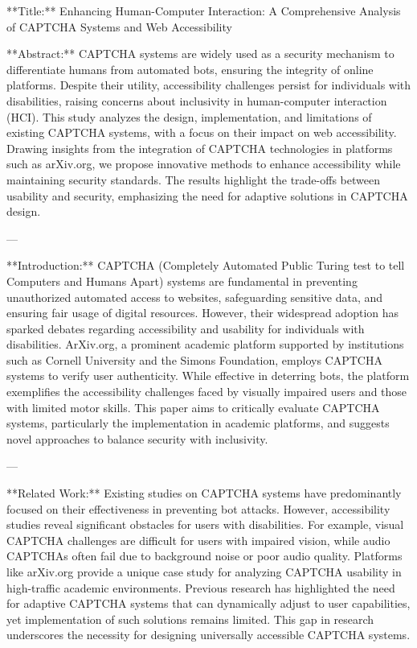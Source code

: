 **Title:** Enhancing Human-Computer Interaction: A Comprehensive Analysis of CAPTCHA Systems and Web Accessibility

**Abstract:**  
CAPTCHA systems are widely used as a security mechanism to differentiate humans from automated bots, ensuring the integrity of online platforms. Despite their utility, accessibility challenges persist for individuals with disabilities, raising concerns about inclusivity in human-computer interaction (HCI). This study analyzes the design, implementation, and limitations of existing CAPTCHA systems, with a focus on their impact on web accessibility. Drawing insights from the integration of CAPTCHA technologies in platforms such as arXiv.org, we propose innovative methods to enhance accessibility while maintaining security standards. The results highlight the trade-offs between usability and security, emphasizing the need for adaptive solutions in CAPTCHA design.

---

**Introduction:**  
CAPTCHA (Completely Automated Public Turing test to tell Computers and Humans Apart) systems are fundamental in preventing unauthorized automated access to websites, safeguarding sensitive data, and ensuring fair usage of digital resources. However, their widespread adoption has sparked debates regarding accessibility and usability for individuals with disabilities. ArXiv.org, a prominent academic platform supported by institutions such as Cornell University and the Simons Foundation, employs CAPTCHA systems to verify user authenticity. While effective in deterring bots, the platform exemplifies the accessibility challenges faced by visually impaired users and those with limited motor skills. This paper aims to critically evaluate CAPTCHA systems, particularly the implementation in academic platforms, and suggests novel approaches to balance security with inclusivity.

---

**Related Work:**  
Existing studies on CAPTCHA systems have predominantly focused on their effectiveness in preventing bot attacks. However, accessibility studies reveal significant obstacles for users with disabilities. For example, visual CAPTCHA challenges are difficult for users with impaired vision, while audio CAPTCHAs often fail due to background noise or poor audio quality. Platforms like arXiv.org provide a unique case study for analyzing CAPTCHA usability in high-traffic academic environments. Previous research has highlighted the need for adaptive CAPTCHA systems that can dynamically adjust to user capabilities, yet implementation of such solutions remains limited. This gap in research underscores the necessity for designing universally accessible CAPTCHA systems.


